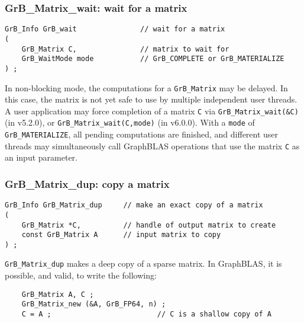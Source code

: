 \documentclass[12pt]{article}
\begin{document}
{%
\subsubsection{{\sf GrB\_Matrix\_wait:} wait for a matrix}
\label{matrix_wait}

\begin{mdframed}[userdefinedwidth=6in]
{\footnotesize
\begin{verbatim}
GrB_Info GrB_wait               // wait for a matrix
(
    GrB_Matrix C,               // matrix to wait for
    GrB_WaitMode mode           // GrB_COMPLETE or GrB_MATERIALIZE
) ;
\end{verbatim}
}\end{mdframed}

In non-blocking mode, the computations for a \verb'GrB_Matrix' may be delayed.
In this case, the matrix is not yet safe to use by multiple independent user
threads.  A user application may force completion of a matrix \verb'C' via
\verb'GrB_Matrix_wait(&C)' (in v5.2.0), or
\verb'GrB_Matrix_wait(C,mode)' (in v6.0.0).
With a \verb'mode' of \verb'GrB_MATERIALIZE',
all pending computations are finished, and different user threads may
simultaneously call GraphBLAS operations that use the matrix \verb'C' as an
input parameter.

\subsubsection{{\sf GrB\_Matrix\_dup:}          copy a matrix}
\label{matrix_dup}

\begin{mdframed}[userdefinedwidth=6in]
{\footnotesize
\begin{verbatim}
GrB_Info GrB_Matrix_dup     // make an exact copy of a matrix
(
    GrB_Matrix *C,          // handle of output matrix to create
    const GrB_Matrix A      // input matrix to copy
) ;
\end{verbatim} } \end{mdframed}

\verb'GrB_Matrix_dup' makes a deep copy of a sparse matrix.
In GraphBLAS, it is possible, and valid, to write the following:

    {\footnotesize
    \begin{verbatim}
    GrB_Matrix A, C ;
    GrB_Matrix_new (&A, GrB_FP64, n) ;
    C = A ;                         // C is a shallow copy of A  \end{verbatim}}

}
\end{document}
